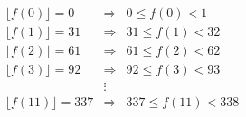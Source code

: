 \documentclass{article}
\begin{document}
\pagestyle{empty}
\[
\begin{array}{lcc}
\lfloor f(0) \rfloor = 0  &\Rightarrow &  0 \le f(0) < 1  \\[1mm]
\lfloor f(1) \rfloor = 31 &\Rightarrow & 31 \le f(1) < 32 \\[1mm]
\lfloor f(2) \rfloor = 61 &\Rightarrow & 61 \le f(2) < 62 \\[1mm]
\lfloor f(3) \rfloor = 92 &\Rightarrow & 92 \le f(3) < 93 \\
                       & \vdots & \\
\lfloor f(11) \rfloor = 337 &\Rightarrow & 337 \le f(11) < 338
\end{array}
\]
\end{document}
